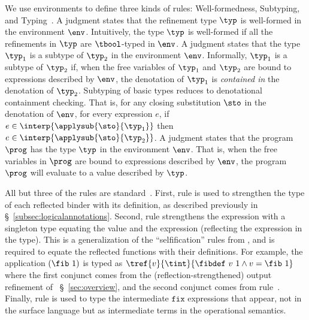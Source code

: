 We use environments to define three kinds of
rules: Well-formedness, Subtyping,
and Typing~\citep{Knowles10,Vazou14}.
%
A judgment \iswellformed{\env}{\typ} states that
the refinement type $\typ$ is well-formed in
the environment $\env$.
%
Intuitively, the type $\typ$ is well-formed if all
the refinements in $\typ$ are $\tbool$-typed in $\env$.
%
A judgment  states
that the type $\typ_1$ is a subtype of %
$\typ_2$ in the environment $\env$.
%
Informally, $\typ_1$ is a subtype of $\typ_2$ if, when
the free variables of $\typ_1$ and $\typ_2$
are bound to expressions described by $\env$,
the denotation of $\typ_1$
is \emph{contained in} the denotation of $\typ_2$.
%
Subtyping of basic types reduces to denotational containment checking.
%
%
That is, for any closing substitution $\sto$
in the denotation of $\env$, for every expression $e$,
if $e \in \interp{\applysub{\sto}{\typ_1}}$ then
$ e \in \interp{\applysub{\sto}{\typ_2}}$.
%
A judgment \hastype{\env}{\prog}{\typ} states that
the program $\prog$ has the type $\typ$ in
the environment $\env$.
That is, when the free variables in $\prog$ are
bound to expressions described by $\env$, the
program $\prog$ will evaluate to a value
described by $\typ$.

%
All but three of the rules are standard~\cite{Knowles10,Vazou14}.
%
First, rule \rtreflect is used to strengthen the type of each
reflected binder with its definition, as described previously
in \S~\ref{subsec:logicalannotations}.
%
Second, rule \rtexact strengthens the expression with
a singleton type equating the value and the expression
(\ie reflecting the expression in the type).
%
This is a generalization of the ``selfification'' rules
from \cite{Ou2004,Knowles10}, and is required to
equate the reflected functions with their definitions.
%
For example, the application $(\fib\ 1)$ is typed as
${\tref{v}{\tint}{\fibdef\ v\ 1 \wedge v = \fib\ 1}}$ where
the first conjunct comes from the (reflection-strengthened)
output refinement of \fib~\S~\ref{sec:overview}, and
the second conjunct comes from rule~\rtexact.
%
Finally, rule \rtfix is used to type the intermediate
$\texttt{fix}$ expressions that appear, not in the
surface language but as intermediate terms in the
operational semantics.

